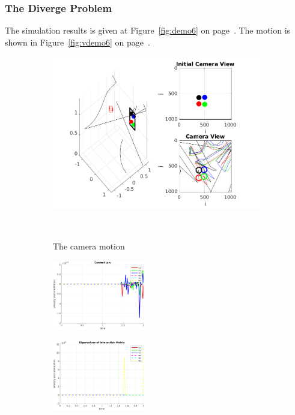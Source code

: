 \documentclass[a4paper,12pt]{article}
\begin{document}
\subsubsection{The Diverge Problem}
The simulation results is given at Figure~\ref{fig:demo6} on page~\pageref{fig:demo6}. The motion is shown in Figure~\ref{fig:vdemo6} on page~\pageref{fig:vdemo6}.
\begin{figure}[t!]
		 \begin{subfigure}[b]{\textwidth}         
         	\centering
	         \includegraphics[width=13cm]{../results/Demo6-simulation.png}
    	     \caption{The camera motion}
    	     \vspace~
		 \end{subfigure}
         \begin{subfigure}[b]{0.32\textwidth}
        	\centering
	        \includegraphics[height=1.2in]{../results/Demo6-control-law.png}
		 \end{subfigure}
         \begin{subfigure}[b]{0.2\textwidth}
        	\centering
	        \includegraphics[height=1.2in]{../results/Demo6-eignen.png}

\end{subfigure}
\end{figure}
\end{document}
